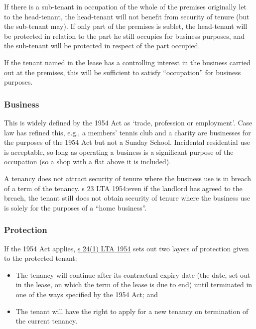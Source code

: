 \documentclass[
]{article}
\providecommand{\tightlist}{%
  \setlength{\itemsep}{0pt}\setlength{\parskip}{0pt}}
\begin{document}
If there is a sub-tenant in occupation of the whole of the premises
originally let to the head-tenant, the head-tenant will not benefit from
security of tenure (but the sub-tenant may). If only part of the
premises is sublet, the head-tenant will be protected in relation to the
part he still occupies for business purposes, and the sub-tenant will be
protected in respect of the part occupied.

If the tenant named in the lease has a controlling interest in the
business carried out at the premises, this will be sufficient to satisfy
``occupation'' for business purposes.

\hypertarget{business}{%
\subsubsection{Business}\label{business}}

This is widely defined by the 1954 Act as `trade, profession or
employment'. Case law has refined this, e.g., a members' tennis club and
a charity are businesses for the purposes of the 1954 Act but not a
Sunday School. Incidental residential use is acceptable, so long as
operating a business is a significant purpose of the occupation (so a
shop with a flat above it is included).

A tenancy does not attract security of tenure where the business use is
in breach of a term of the tenancy. s 23 LTA 1954:even if the landlord
has agreed to the breach, the tenant still does not obtain security of
tenure where the business use is solely for the purposes of a ``home
business''.

\hypertarget{protection}{%
\subsubsection{Protection}\label{protection}}

If the 1954 Act applies,
\href{https://www.legislation.gov.uk/ukpga/Eliz2/2-3/56/section/24}{s
24(1) LTA 1954} sets out two layers of protection given to the protected
tenant:

\begin{itemize}
\tightlist
\item
  The tenancy will continue after its contractual expiry date (the date,
  set out in the lease, on which the term of the lease is due to end)
  until terminated in one of the ways specified by the 1954 Act; and
\item
  The tenant will have the right to apply for a new tenancy on
  termination of the current tenancy.
\end{itemize}
\end{document}
